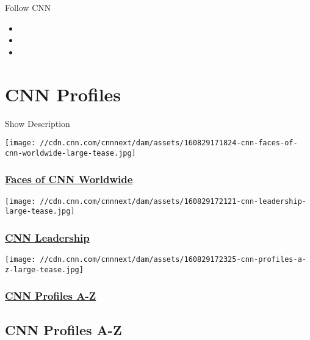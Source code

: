 Follow CNN

\begin{itemize}
\item
\item
\item
\end{itemize}

\hypertarget{cnn-profiles}{%
\section{CNN Profiles}\label{cnn-profiles}}

Show Description

\href{/specials/tv/anchors-and-reporters}{}

\texttt{[image: //cdn.cnn.com/cnnnext/dam/assets/160829171824-cnn-faces-of-cnn-worldwide-large-tease.jpg]}

\hypertarget{faces-of-cnn-worldwide}{%
\subsubsection{\texorpdfstring{\href{/specials/tv/anchors-and-reporters}{Faces
of CNN
Worldwide}}{Faces of CNN Worldwide}}\label{faces-of-cnn-worldwide}}

\href{/specials/more/cnn-leadership}{}

\texttt{[image: //cdn.cnn.com/cnnnext/dam/assets/160829172121-cnn-leadership-large-tease.jpg]}

\hypertarget{cnn-leadership}{%
\subsubsection{\texorpdfstring{\href{/specials/more/cnn-leadership}{CNN
Leadership}}{CNN Leadership}}\label{cnn-leadership}}

\href{/specials/profiles}{}

\texttt{[image: //cdn.cnn.com/cnnnext/dam/assets/160829172325-cnn-profiles-a-z-large-tease.jpg]}

\hypertarget{cnn-profiles-a-z}{%
\subsubsection{\texorpdfstring{\href{/specials/profiles}{CNN Profiles
A-Z}}{CNN Profiles A-Z}}\label{cnn-profiles-a-z}}

\hypertarget{cnn-profiles-a-z-}{%
\subsection{CNN Profiles A-Z~}\label{cnn-profiles-a-z-}}

